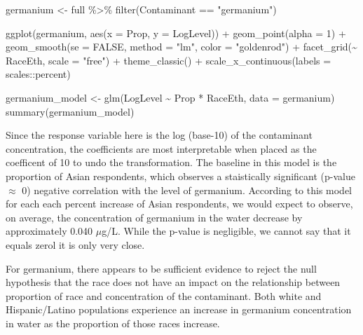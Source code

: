 \documentclass[
  letterpaper,
  DIV=11,
  numbers=noendperiod]{scrartcl}
\newenvironment{Shaded}{\begin{snugshade}}{\end{snugshade}}
\newcommand{\AttributeTok}[1]{\textcolor[rgb]{0.40,0.45,0.13}{#1}}
\newcommand{\ConstantTok}[1]{\textcolor[rgb]{0.56,0.35,0.01}{#1}}
\newcommand{\DecValTok}[1]{\textcolor[rgb]{0.68,0.00,0.00}{#1}}
\newcommand{\FunctionTok}[1]{\textcolor[rgb]{0.28,0.35,0.67}{#1}}
\newcommand{\NormalTok}[1]{\textcolor[rgb]{0.00,0.23,0.31}{#1}}
\newcommand{\OtherTok}[1]{\textcolor[rgb]{0.00,0.23,0.31}{#1}}
\newcommand{\SpecialCharTok}[1]{\textcolor[rgb]{0.37,0.37,0.37}{#1}}
\newcommand{\StringTok}[1]{\textcolor[rgb]{0.13,0.47,0.30}{#1}}
\begin{document}
\begin{Shaded}
\begin{Highlighting}[]
\NormalTok{germanium }\OtherTok{\textless{}{-}}\NormalTok{ full }\SpecialCharTok{\%\textgreater{}\%} 
  \FunctionTok{filter}\NormalTok{(Contaminant }\SpecialCharTok{==} \StringTok{"germanium"}\NormalTok{)}

\FunctionTok{ggplot}\NormalTok{(germanium, }\FunctionTok{aes}\NormalTok{(}\AttributeTok{x =}\NormalTok{ Prop, }\AttributeTok{y =}\NormalTok{ LogLevel)) }\SpecialCharTok{+}
  \FunctionTok{geom\_point}\NormalTok{(}\AttributeTok{alpha =} \DecValTok{1}\NormalTok{) }\SpecialCharTok{+}
  \FunctionTok{geom\_smooth}\NormalTok{(}\AttributeTok{se =} \ConstantTok{FALSE}\NormalTok{, }\AttributeTok{method =} \StringTok{"lm"}\NormalTok{, }\AttributeTok{color =} \StringTok{"goldenrod"}\NormalTok{) }\SpecialCharTok{+}
  \FunctionTok{facet\_grid}\NormalTok{(}\SpecialCharTok{\textasciitilde{}}\NormalTok{ RaceEth, }\AttributeTok{scale =} \StringTok{"free"}\NormalTok{) }\SpecialCharTok{+}
  \FunctionTok{theme\_classic}\NormalTok{() }\SpecialCharTok{+}
  \FunctionTok{scale\_x\_continuous}\NormalTok{(}\AttributeTok{labels =}\NormalTok{ scales}\SpecialCharTok{::}\NormalTok{percent)}

\NormalTok{germanium\_model }\OtherTok{\textless{}{-}} \FunctionTok{glm}\NormalTok{(LogLevel }\SpecialCharTok{\textasciitilde{}}\NormalTok{ Prop }\SpecialCharTok{*}\NormalTok{ RaceEth, }\AttributeTok{data =}\NormalTok{ germanium)}
\FunctionTok{summary}\NormalTok{(germanium\_model)}
\end{Highlighting}
\end{Shaded}

Since the response variable here is the log (base-10) of the contaminant
concentration, the coefficients are most interpretable when placed as
the coefficent of 10 to undo the transformation. The baseline in this
model is the proportion of Asian respondents, which observes a
staistically significant (p-value \(\approx\) 0) negative correlation
with the level of germanium. According to this model for each each
percent increase of Asian respondents, we would expect to observe, on
average, the concentration of germanium in the water decrease by
approximately 0.040 \(\mu\)g/L. While the p-value is negligible, we
cannot say that it equals zerol it is only very close.

For germanium, there appears to be sufficient evidence to reject the
null hypothesis that the race does not have an impact on the
relationship between proportion of race and concentration of the
contaminant. Both white and Hispanic/Latino populations experience an
increase in germanium concentration in water as the proportion of those
races increase.
\end{document}

